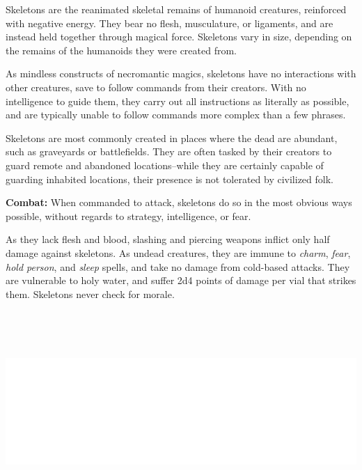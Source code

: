 \begin{multicols}{2}
\begin{minipage}{\columnwidth}
\end{minipage}

Skeletons are the reanimated skeletal remains of humanoid creatures, reinforced with negative energy. They bear no flesh, musculature, or ligaments, and are instead held together through magical force. Skeletons vary in size, depending on the remains of the humanoids they were created from.

As mindless constructs of necromantic magics, skeletons have no interactions with other creatures, save to follow commands from their creators. With no intelligence to guide them, they carry out all instructions as literally as possible, and are typically unable to follow commands more complex than a few phrases.

Skeletons are most commonly created in places where the dead are abundant, such as graveyards or battlefields. They are often tasked by their creators to guard remote and abandoned locations--while they are certainly capable of guarding inhabited locations, their presence is not tolerated by civilized folk.

\textbf{Combat:} When commanded to attack, skeletons do so in the most obvious ways possible, without regards to strategy, intelligence, or fear. 

As they lack flesh and blood, slashing and piercing weapons inflict only half damage against skeletons. As undead creatures, they are immune to \textit{charm}, \textit{fear}, \textit{hold person}, and \textit{sleep} spells, and take no damage from cold-based attacks. They are vulnerable to holy water, and suffer 2d4 points of damage per vial that strikes them. Skeletons never check for morale.

\noindent\includegraphics[width=\columnwidth, height=3in]{testblock.pdf}


\end{multicols}
